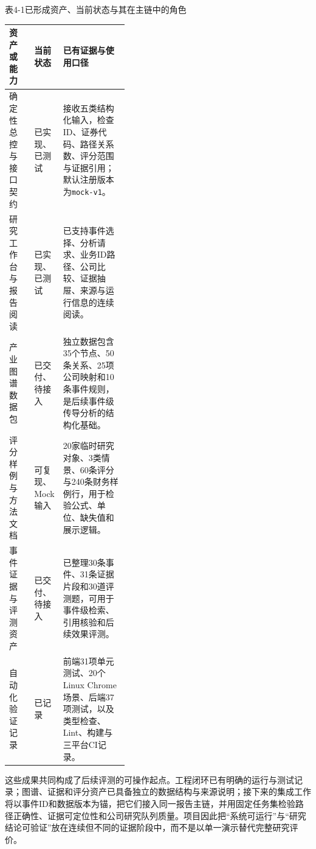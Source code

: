 \begin{center}\small 表4-1\quad 已形成资产、当前状态与其在主链中的角色\par\vspace{1mm}
\begin{tabularx}{\linewidth}{p{0.21\linewidth}p{0.18\linewidth}X}
\toprule
资产或能力 & 当前状态 & 已有证据与使用口径\\
\midrule
确定性总控与接口契约 & 已实现、已测试 & 接收五类结构化输入，检查ID、证券代码、路径关系数、评分范围与证据引用；默认注册版本为\texttt{mock-v1}。\\
研究工作台与报告阅读 & 已实现、已测试 & 已支持事件选择、分析请求、业务ID路径、公司比较、证据抽屉、来源与运行信息的连续阅读。\\
产业图谱数据包 & 已交付、待接入 & 独立数据包含35个节点、50条关系、25项公司映射和10条事件规则，是后续事件级传导分析的结构化基础。\\
评分样例与方法文档 & 可复现、Mock输入 & 20家临时研究对象、3类情景、60条评分与240条财务样例行，用于检验公式、单位、缺失值和展示逻辑。\\
事件证据与评测资产 & 已交付、待接入 & 已整理30条事件、31条证据片段和30道评测题，可用于事件级检索、引用核验和后续效果评测。\\
自动化验证记录 & 已记录 & 前端31项单元测试、20个Linux Chrome场景、后端37项测试，以及类型检查、Lint、构建与三平台CI记录。\\
\bottomrule
\end{tabularx}\end{center}

这些成果共同构成了后续评测的可操作起点。工程闭环已有明确的运行与测试记录；图谱、证据和评分资产已具备独立的数据结构与来源说明；接下来的集成工作将以事件ID和数据版本为锚，把它们接入同一报告主链，并用固定任务集检验路径正确性、证据可定位性和公司研究队列质量。项目因此把“系统可运行”与“研究结论可验证”放在连续但不同的证据阶段中，而不是以单一演示替代完整研究评价。
